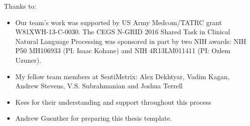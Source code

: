\noindent
Thanks to:
\begin{itemize}
    \item Our team's work was supported by US Army Medcom/TATRC grant W81XWH-13-C-0030.
The CEGS N-GRID 2016 Shared Task in Clinical Natural Language Processing
 was sponsored in part by two NIH awards: NIH P50 MH106933 (PI: Isaac Kohane) and
NIH 4R13LM011411 (PI: Ozlem Uzuner).
    \item My fellow team members at SentiMetrix: Alex Dekhtyar, Vadim Kagan, Andrew Stevens, V.S. Subrahmanian and Joshua Terrell
    \item Kees for their understanding and support throughout this process
    \item Andrew Guenther for preparing this thesis template.
\end{itemize}
